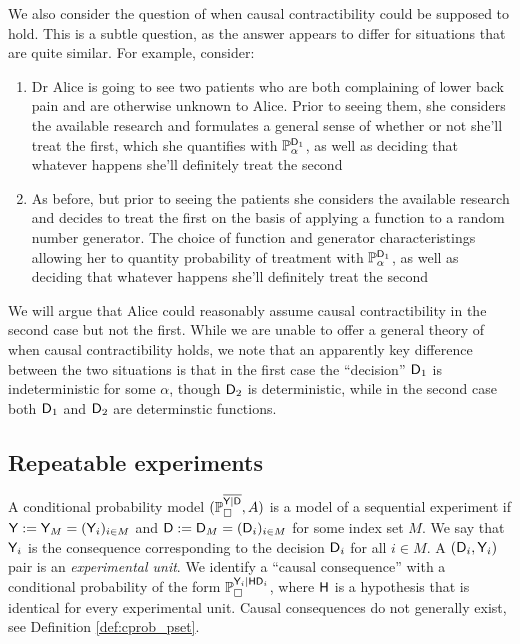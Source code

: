 We also consider the question of when causal contractibility could be supposed to hold. This is a subtle question, as the answer appears to differ for situations that are quite similar. For example, consider:
\begin{enumerate}
    \item Dr Alice is going to see two patients who are both complaining of lower back pain and are otherwise unknown to Alice. Prior to seeing them, she considers the available research and formulates a general sense of whether or not she'll treat the first, which she quantifies with $\mathbb{P}_\alpha^{\mathsf{D}_1}$, as well as deciding that whatever happens she'll definitely treat the second
    \item As before, but prior to seeing the patients she considers the available research and decides to treat the first on the basis of applying a function to a random number generator. The choice of function and generator characteristings allowing her to quantity probability of treatment with $\mathbb{P}_\alpha^{\mathsf{D}_1}$, as well as deciding that whatever happens she'll definitely treat the second
\end{enumerate}


We will argue that Alice could reasonably assume causal contractibility in the second case but not the first. While we are unable to offer a general theory of when causal contractibility holds, we note that an apparently key difference between the two situations is that in the first case the ``decision'' $\mathsf{D}_1$ is indeterministic for some $\alpha$, though $\mathsf{D}_2$ is deterministic, while in the second case both $\mathsf{D}_1$ and $\mathsf{D}_2$ are determinstic functions.

\subsection{Repeatable experiments}

A conditional probability model $(\mathbb{P}_\square^{\overline{\mathsf{Y}|\mathsf{D}}},A)$ is a model of a sequential experiment if $\mathsf{Y}:=\mathsf{Y}_M=(\mathsf{Y}_i)_{i\in M}$ and $\mathsf{D}:=\mathsf{D}_M=(\mathsf{D}_i)_{i\in M}$ for some index set $M$. We say that $\mathsf{Y}_i$ is the consequence corresponding to the decision $\mathsf{D}_i$ for all $i\in M$. A $(\mathsf{D}_i,\mathsf{Y}_i)$ pair is an \emph{experimental unit}. We identify a ``causal consequence'' with a conditional probability of the form $\mathbb{P}_\square^{\mathsf{Y}_i|\mathsf{H}\mathsf{D}_i}$, where $\mathsf{H}$ is a hypothesis that is identical for every experimental unit. Causal consequences do not generally exist, see Definition \ref{def:cprob_pset}.

